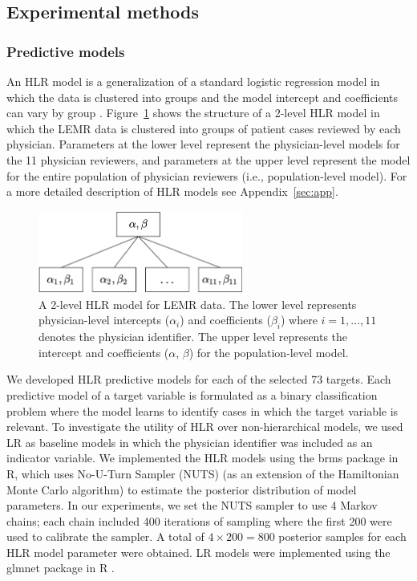 \subsection{Experimental methods}\label{sec:exp_methods}
\subsubsection{Predictive models}
An HLR model is a generalization of a standard logistic regression model in which the data is clustered into groups and the model intercept and coefficients can vary by group \cite{gelman2006data}. Figure~\ref{fig:2} shows the structure of a 2-level HLR model in which the LEMR data is clustered into groups of patient cases reviewed by each physician. Parameters at the lower level represent the physician-level models for the 11 physician reviewers, and parameters at the upper level represent the model for the entire population of physician reviewers (i.e., population-level model). For a more detailed description of HLR models see Appendix~\ref{sec:app}.

\begin{figure}[!h]
    \centering
    \includegraphics[width=0.6\textwidth]{./pictures/Figure2}
    \caption{
    A 2-level HLR model for LEMR data. The lower level represents physician-level intercepts ($\alpha_i$) and coefficients ($\beta_i$) where $i=1,...,11$ denotes the physician identifier. The upper level represents the intercept and coefficients ($\alpha$, $\beta$) for the population-level model.}\label{fig:2}
\end{figure}

We developed HLR predictive models for each of the selected 73 targets. Each predictive model of a target variable is formulated as a binary classification problem where the model learns to identify cases in which the target variable is relevant. To investigate the utility of HLR over non-hierarchical models, we used LR as baseline models in which the physician identifier was included as an indicator variable. We implemented the HLR models using the brms package \cite{Burkner2017} in R, which uses No-U-Turn Sampler (NUTS) (as an extension of the Hamiltonian Monte Carlo algorithm) to estimate the posterior distribution of model parameters. In our experiments, we set the NUTS sampler to use 4 Markov chains; each chain included 400 iterations of sampling where the first 200 were used to calibrate the sampler. A total of $4 \times 200 = 800$ posterior samples for each HLR model parameter were obtained. LR models were implemented using the glmnet package in R \cite{Friedman2010}.

